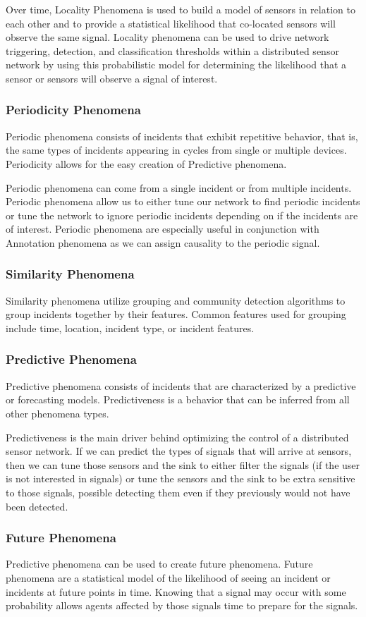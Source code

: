 Over time, Locality Phenomena is used to build a model of sensors in relation to each other and to provide a statistical likelihood that co-located sensors will observe the same signal. Locality phenomena can be used to drive network triggering, detection, and classification thresholds within a distributed sensor network by using this probabilistic model for determining the likelihood that a sensor or sensors will observe a signal of interest.

\subsubsection{Periodicity Phenomena} \label{periodicity-phenomena}
Periodic phenomena consists of incidents that exhibit repetitive behavior, that is, the same types of incidents appearing in cycles from single or multiple devices. Periodicity allows for the easy creation of Predictive phenomena.

Periodic phenomena can come from a single incident or from multiple incidents. Periodic phenomena allow us to either tune our network to find periodic incidents or tune the  network to ignore periodic incidents depending on if the incidents are of interest. Periodic phenomena are especially useful in conjunction with Annotation phenomena as we can assign causality to the periodic signal. 

\subsubsection{Similarity Phenomena}
Similarity phenomena utilize grouping and community detection algorithms to group incidents together by their features. Common features used for grouping include time, location, incident type, or incident features.


\subsubsection{Predictive Phenomena}
Predictive phenomena consists of incidents that are characterized by a predictive or forecasting models. Predictiveness is a behavior that can be inferred from all other phenomena types. 

Predictiveness is the main driver behind optimizing the control of a distributed sensor network. If we can predict the types of signals that will arrive at sensors, then we can tune those sensors and the sink to either filter the signals (if the user is not interested in signals) or tune the sensors and the sink to be extra sensitive to those signals, possible detecting them even if they previously would not have been detected.

\subsubsection{Future Phenomena}
Predictive phenomena can be used to create future phenomena. Future phenomena are a statistical model of the likelihood of seeing an incident or incidents at future points in time. Knowing that a signal may occur with some probability allows agents affected by those signals time to prepare for the signals.

